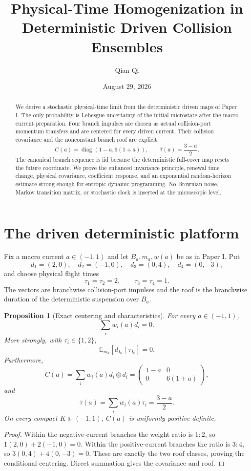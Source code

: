 \documentclass[11pt,reqno]{amsart}
\title[Physical-time deterministic homogenization]{Physical-Time Homogenization in Deterministic Driven Collision Ensembles}
\author{Qian Qi}
\date{August 29, 2026}
\newtheorem{proposition}[theorem]{Proposition}
\theoremstyle{remark}
\newcommand{\E}{\mathbb E}
\begin{document}
\raggedbottom
\begin{abstract}
We derive a stochastic physical-time limit from the deterministic driven maps
of Paper I.  The only probability is Lebesgue uncertainty of the initial
microstate after the macro current preparation.  Four branch impulses are
chosen as actual collision-port momentum transfers and are centered for every
driven current.  Their collision covariance and the nonconstant branch roof
are explicit:
\[
 C(a)=\operatorname{diag}(1-a,6(1+a)),\qquad
 \bar\tau(a)=\frac{3-a}{2}.
\]
The canonical branch sequence is iid because the deterministic full-cover map
resets the future coordinate.  We prove the enhanced invariance principle,
renewal time change, physical covariance, coefficient response, and an
exponential random-horizon estimate strong enough for entropic dynamic
programming.  No Brownian noise, Markov transition matrix, or stochastic clock
is inserted at the microscopic level.
\end{abstract}
\maketitle
\tableofcontents

\section{The driven deterministic platform}
Fix a macro current $a\in(-1,1)$ and let $B_a,m_a,w(a)$ be as in Paper I.
Put
\[
 d_1=(2,0),\quad d_2=(-1,0),\quad
 d_3=(0,4),\quad d_4=(0,-3),
\]
and choose physical flight times
\[
 \tau_1=\tau_2=2,\qquad \tau_3=\tau_4=1.
\]
The vectors are branchwise collision-port impulses and the roof is the
branchwise duration of the deterministic suspension over $B_a$.

\begin{proposition}[Exact centering and characteristics]\label{prop:chars}
For every $a\in(-1,1)$,
\[
 \sum_iw_i(a)d_i=0.
\]
More strongly, with $\tau_i\in\{1,2\}$,
\[
 \E_{m_a}[d_{I_0}\mid\tau_{I_0}]=0.
\]
Furthermore,
\[
 C(a)=\sum_iw_i(a)d_i\otimes d_i
 =\begin{pmatrix}1-a&0\\0&6(1+a)\end{pmatrix},
\]
and
\[
 \bar\tau(a)=\sum_iw_i(a)\tau_i=\frac{3-a}{2}.
\]
On every compact $K\Subset(-1,1)$, $C(a)$ is uniformly positive definite.
\end{proposition}
\begin{proof}
Within the negative-current branches the weight ratio is $1:2$, so
$1(2,0)+2(-1,0)=0$.  Within the positive-current branches the ratio is $3:4$,
so $3(0,4)+4(0,-3)=0$.  These are exactly the two roof classes, proving the
conditional centering.  Direct summation gives the covariance and roof.
\end{proof}
\end{document}
